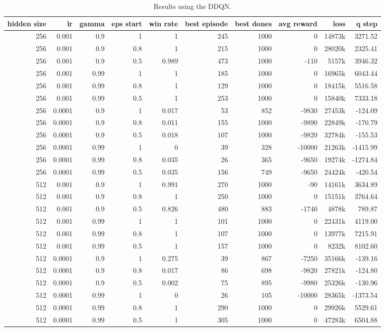 \begin{table}[h]
	\centering
	\scriptsize
	\begin{tabular}{r r r r | r r r r r r}
		\toprule
			hidden size & lr & gamma & eps start & win rate & best episode & best dones & avg reward & loss & q step \\
		\midrule
			256 & 0.001 & 0.9 & 1 & 1 & 245 & 1000 & 0 & 14873k & 3271.52 \\
			256 & 0.001 & 0.9 & 0.8 & 1 & 215 & 1000 & 0 & 28020k & 2325.41 \\
			256 & 0.001 & 0.9 & 0.5 & 0.989 & 473 & 1000 & -110 & 5157k & 3946.32 \\
			256 & 0.001 & 0.99 & 1 & 1 & 185 & 1000 & 0 & 16965k & 6043.44 \\
			256 & 0.001 & 0.99 & 0.8 & 1 & 129 & 1000 & 0 & 18415k & 5516.58 \\
			256 & 0.001 & 0.99 & 0.5 & 1 & 253 & 1000 & 0 & 15840k & 7333.18 \\
			256 & 0.0001 & 0.9 & 1 & 0.017 & 53 & 852 & -9830 & 27453k & -124.09 \\
			256 & 0.0001 & 0.9 & 0.8 & 0.011 & 155 & 1000 & -9890 & 22849k & -170.79 \\
			256 & 0.0001 & 0.9 & 0.5 & 0.018 & 107 & 1000 & -9820 & 32784k & -155.53 \\
			256 & 0.0001 & 0.99 & 1 & 0 & 39 & 328 & -10000 & 21263k & -1415.99 \\
			256 & 0.0001 & 0.99 & 0.8 & 0.035 & 26 & 365 & -9650 & 19274k & -1274.84 \\
			256 & 0.0001 & 0.99 & 0.5 & 0.035 & 156 & 749 & -9650 & 24424k & -420.54 \\
			512 & 0.001 & 0.9 & 1 & 0.991 & 270 & 1000 & -90 & 14161k & 3634.89 \\
			512 & 0.001 & 0.9 & 0.8 & 1 & 250 & 1000 & 0 & 15151k & 3764.64 \\
			512 & 0.001 & 0.9 & 0.5 & 0.826 & 480 & 883 & -1740 & 4878k & 789.87 \\
			512 & 0.001 & 0.99 & 1 & 1 & 101 & 1000 & 0 & 22431k & 4119.00 \\
			512 & 0.001 & 0.99 & 0.8 & 1 & 107 & 1000 & 0 & 13977k & 7215.91 \\
			512 & 0.001 & 0.99 & 0.5 & 1 & 157 & 1000 & 0 & 8232k & 8102.60 \\
			512 & 0.0001 & 0.9 & 1 & 0.275 & 39 & 867 & -7250 & 35166k & -139.16 \\
			512 & 0.0001 & 0.9 & 0.8 & 0.017 & 86 & 698 & -9820 & 27821k & -124.80 \\
			512 & 0.0001 & 0.9 & 0.5 & 0.002 & 75 & 895 & -9980 & 25326k & -130.96 \\
			512 & 0.0001 & 0.99 & 1 & 0 & 26 & 105 & -10000 & 28365k & -1373.54 \\
			512 & 0.0001 & 0.99 & 0.8 & 1 & 290 & 1000 & 0 & 29926k & 5529.61 \\
			512 & 0.0001 & 0.99 & 0.5 & 1 & 305 & 1000 & 0 & 47283k & 6504.88 \\
		\bottomrule
	\end{tabular}
	\caption{Results using the DDQN.}
	\label{ddqn_results}
\end{table}
